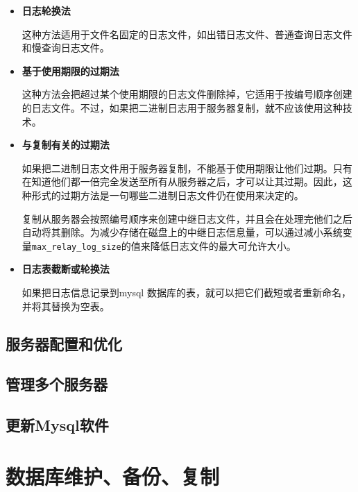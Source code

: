 \documentclass[UTF8,a4paper,12pt]{ctexbook}
\begin{document}
			\begin{itemize}
				\item \textbf{日志轮换法}
					
					这种方法适用于文件名固定的日志文件，如出错日志文件、普通查询日志文件和慢查询日志文件。
					
				\item \textbf{基于使用期限的过期法}
				
					这种方法会把超过某个使用期限的日志文件删除掉，它适用于按编号顺序创建的日志文件。不过，如果把二进制日志用于服务器复制，就不应该使用这种技术。
					
				\item \textbf{与复制有关的过期法}
				
					如果把二进制日志文件用于服务器复制，不能基于使用期限让他们过期。只有在知道他们都一倍完全发送至所有从服务器之后，才可以让其过期。因此，这种形式的过期方法是一句哪些二进制日志文件仍在使用来决定的。
					
					复制从服务器会按照编号顺序来创建中继日志文件，并且会在处理完他们之后自动将其删除。为减少存储在磁盘上的中继日志信息量，可以通过减小系统变量\verb|max_relay_log_size|的值来降低日志文件的最大可允许大小。
					
				\item \textbf{日志表截断或轮换法}
					
					如果把日志信息记录到mysql 数据库的表，就可以把它们截短或者重新命名，并将其替换为空表。
			\end{itemize}
		
		
		\subsection{服务器配置和优化}
		
		
		
		
		\subsection{管理多个服务器}
		
		
		
		\subsection{更新Mysql软件}
	
	
	
	
	\section{数据库维护、备份、复制}
		
\end{document}
